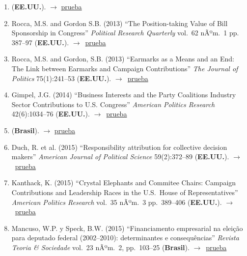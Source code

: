 \documentclass[12 pt, letter]{article}
\newenvironment{CitasMiTrabajo}{
    \begin{footnotesize}
    \begin{enumerate}[label={\footnotesize\emph{cita~\arabic*}},ref=\arabic*] %
        \setlength{\itemsep}{.1\itemsep}
        \setlength{\parskip}{.1\parskip}
    }{\end{enumerate}\end{footnotesize}}
\begin{document}
\begin{CitasMiTrabajo}
        \item {} (\textbf{EE.UU.}). $\rightarrow$ \href{http://ericmagar.com/cv/cites/coxMagar/jenkins.monroeBuyNegAgenda2012ajps.pdf}{prueba}

        \item Rocca, M.S. and Gordon S.B. (2013) ``The Position-taking Value of Bill Sponsorship in Congress'' \emph{Political Research Quarterly} vol.\ 62 nÃºm.\ 1 pp. 387--97 (\textbf{EE.UU.}). $\rightarrow$~\href{http://ericmagar.com/cv/cites/coxMagar/rocca.gordonPosTakSponsoring2010prq.pdf}{prueba}

        \item Rocca, M.S. and Gordon, S.B. (2013) ``Earmarks as a Means and an End: The Link between Earmarks and Campaign Contributions'' \emph{The Journal of Politics} 75(1):241--53 (\textbf{EE.UU.}). $\rightarrow$~\href{http://ericmagar.com/cv/cites/coxMagar/rocca.gordonEarmarks2013jop.pdf}{prueba}

        \item Gimpel, J.G. (2014) ``Business Interests and the Party Coalitions Industry Sector Contributions to U.S. Congress'' \emph{American Politics Research} 42(6):1034--76 (\textbf{EE.UU.}). $\rightarrow$~\href{http://ericmagar.com/cv/cites/coxMagar/gimpel.etalBusPacs2014apr.pdf}{prueba}

        \item {} (\textbf{Brasil}). $\rightarrow$ \href{http://ericmagar.com/cv/cites/coxMagar/castroAccountBrasil2014opPub.pdf}{prueba}

        \item Duch, R. et al. (2015) ``Responsibility attribution for collective decision makers'' \emph{American Journal of Political Science} 59(2):372--89 (\textbf{EE.UU.}). $\rightarrow$~\href{http://ericmagar.com/cv/cites/coxMagar/duch.etalAttribution2015ajps.pdf}{prueba}

        \item Kanthack, K. (2015) ``Crystal Elephants and Commitee Chairs: Campaign Contributions and Leadership Races in the U.S.\ House of Representatives'' \emph{American Politics Research} vol.\ 35 nÃºm.\ 3 pp.\ 389--406 (\textbf{EE.UU.}). $\rightarrow$~\href{http://ericmagar.com/cv/cites/coxMagar/kanthak.ContributionsChairs2007apr.pdf}{prueba}

        \item Mancuso, W.P. y Speck, B.W. (2015)
        ``Financiamento empresarial na elei{\c{c}}{\~a}o para deputado federal (2002--2010): determinantes e consequ{\^e}ncias''
        \emph{Revista Teoria \& Sociedade} vol.\ 23 nÃºm.\ 2, pp.\ 103--25 (\textbf{Brasil}). $\rightarrow$~\href{http://ericmagar.com/cv/cites/coxMagar/mancuso2015financiamento.pdf}{prueba}


\end{CitasMiTrabajo}
\end{document}
